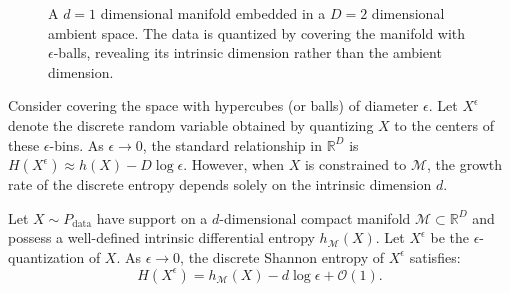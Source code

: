\begin{figure}[ht]
    \centering
    \caption{A $d=1$ dimensional manifold embedded in a $D=2$ dimensional ambient space. The data is quantized by covering the manifold with $\epsilon$-balls, revealing its intrinsic dimension rather than the ambient dimension.}
    \label{fig:manifold_cover}
\end{figure}

Consider covering the space with hypercubes (or balls) of diameter $\epsilon$. Let $X^\epsilon$ denote the discrete random variable obtained by quantizing $X$ to the centers of these $\epsilon$-bins. As $\epsilon \to 0$, the standard relationship in $\mathbb{R}^D$ is $H(X^\epsilon) \approx h(X) - D \log \epsilon$. However, when $X$ is constrained to $\mathcal{M}$, the growth rate of the discrete entropy depends solely on the intrinsic dimension $d$.

\begin{theorem}
Let $X \sim P_{\text{data}}$ have support on a $d$-dimensional compact manifold $\mathcal{M} \subset \mathbb{R}^D$ and possess a well-defined intrinsic differential entropy $h_{\mathcal{M}}(X)$. Let $X^\epsilon$ be the $\epsilon$-quantization of $X$. As $\epsilon \to 0$, the discrete Shannon entropy of $X^\epsilon$ satisfies:
\begin{equation}
    H(X^\epsilon) = h_{\mathcal{M}}(X) - d \log \epsilon + \mathcal{O}(1).
\end{equation}
\end{theorem}

